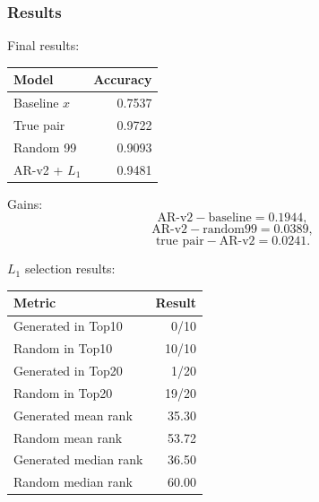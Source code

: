 \subsubsection{Results}

Final results:

\begin{center}
\begin{tabular}{lr}
\toprule
Model & Accuracy \\
\midrule
Baseline $x$ & 0.7537 \\
True pair & 0.9722 \\
Random 99 & 0.9093 \\
AR-v2 + $L_1$ & 0.9481 \\
\bottomrule
\end{tabular}
\end{center}

Gains:
\[
\text{AR-v2} - \text{baseline}=0.1944,
\]
\[
\text{AR-v2} - \text{random99}=0.0389,
\]
\[
\text{true pair} - \text{AR-v2}=0.0241.
\]

$L_1$ selection results:

\begin{center}
\begin{tabular}{lr}
\toprule
Metric & Result \\
\midrule
Generated in Top10 & 0/10 \\
Random in Top10 & 10/10 \\
Generated in Top20 & 1/20 \\
Random in Top20 & 19/20 \\
Generated mean rank & 35.30 \\
Random mean rank & 53.72 \\
Generated median rank & 36.50 \\
Random median rank & 60.00 \\
\bottomrule
\end{tabular}
\end{center}
